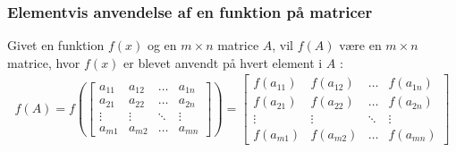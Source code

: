 \documentclass{article}
\begin{document}
\subsubsection{Elementvis anvendelse af en funktion på matricer}
Givet en funktion $f(x)$ og en $m \times n$ matrice $A$, vil $f(A)$ være en $m \times n$ matrice, hvor $f(x)$ er blevet anvendt på hvert element i $A$ \parencite{Lauritzen_2019}:
\begin{align}
  f(A) = f \left( \begin{bmatrix}
    a_{11} & a_{12} & \ldots & a_{1n} \\
    a_{21} & a_{22} & \ldots & a_{2n} \\
    \vdots & \vdots & \ddots & \vdots \\
    a_{m1} & a_{m2} & \ldots & a_{mn}
  \end{bmatrix} \right) = \begin{bmatrix}
    f(a_{11}) & f(a_{12}) & \ldots & f(a_{1n}) \\
    f(a_{21}) & f(a_{22}) & \ldots & f(a_{2n}) \\
    \vdots & \vdots & \ddots & \vdots \\
    f(a_{m1}) & f(a_{m2}) & \ldots & f(a_{mn})
  \end{bmatrix}
\end{align} 
\end{document}
